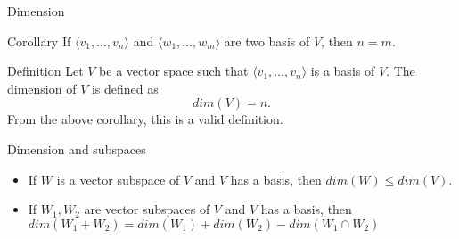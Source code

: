 \documentclass{beamer}
\begin{document}
\begin{frame}{Dimension}
  
  \begin{block}{Corollary}
    If $\langle v_1, \dots, v_n \rangle$ and $\langle w_1, \dots, w_m \rangle$ are two basis of $V$, then $n = m$.
  \end{block}

  \begin{block}{Definition}
    Let $V$ be a vector space such that $\langle v_1, \dots, v_n \rangle$ is a basis of $V$. The dimension of $V$ is defined as
    \[dim(V) = n.\]
    From the above corollary, this is a valid definition.
  \end{block}
\end{frame}


\begin{frame}{Dimension and subspaces}
  \begin{itemize}
  \item If $W$ is a vector subspace of $V$ and $V$ has a basis, then $dim(W) \le dim(V)$.
  \item If $W_1, W_2$ are vector subspaces of $V$ and $V$ has a basis, then $dim(W_1 + W_2) = dim(W_1) + dim(W_2) - dim(W_1 \cap W_2)$
  \end{itemize}
\end{frame}
\end{document}
